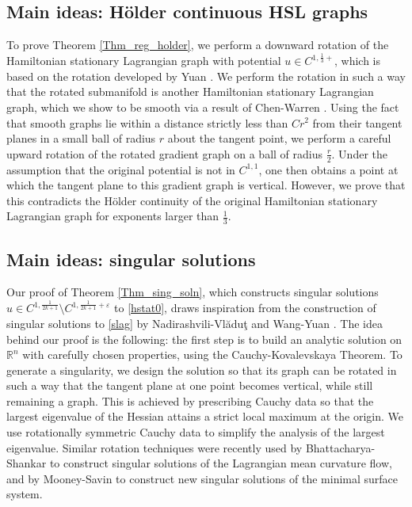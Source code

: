 \documentclass[12pt,reqno]{amsart}%
\theoremstyle{plain}
\numberwithin{equation}{section}
\theoremstyle{definition}
\theoremstyle{remark}
\newcommand{\R}{\mathbb{R}}
\begin{document}
\subsection{Main ideas: H\"older continuous HSL graphs} To prove Theorem \ref{Thm_reg_holder}, we perform a downward rotation of the Hamiltonian stationary Lagrangian graph with potential $u\in C^{1, \frac{1}{3}+}$, which is based on the rotation developed by Yuan \cite{YY02}.
We perform the rotation in such a way that the rotated submanifold is another Hamiltonian stationary Lagrangian graph, which we show to be smooth via a result of Chen-Warren \cite{ChenWarren}. 
Using the fact that smooth graphs lie within a distance strictly less than $Cr^2$ from their tangent planes in a small ball of radius $r$ about the tangent point, we perform a careful upward rotation of the rotated gradient graph on a ball of radius $\frac{r}{2}$. Under the assumption that the original potential is not in $C^{1,1}$, one then obtains a point at which the tangent plane to this gradient graph is vertical. However, we prove that this contradicts the Hölder continuity of the original Hamiltonian stationary Lagrangian graph for exponents larger than $\frac{1}{3}$. 














\subsection{Main ideas: singular solutions} 
Our proof of Theorem \ref{Thm_sing_soln}, which constructs singular solutions $u \in  C^{1, \frac 1{2k+1}} \setminus C^{1,\frac1{2k+1} + \varepsilon }$ to \eqref{hstat0}, draws inspiration from the construction of singular solutions to \eqref{slag} by Nadirashvili-Vl\u{a}du\c{t} \cite{NV} and Wang-Yuan \cite{WangY}. The idea behind our proof is the following: the first step is to build an analytic solution on $\R^n$ with carefully chosen properties, using the Cauchy-Kovalevskaya Theorem. To generate a singularity, we design the solution so that its graph can be rotated in such a way that the tangent plane at one point becomes vertical, while still remaining a graph. This is achieved by prescribing Cauchy data so that the largest eigenvalue of the Hessian attains a strict local maximum at the origin. We use rotationally symmetric Cauchy data to simplify the analysis of the largest eigenvalue. Similar rotation techniques were recently used by Bhattacharya-Shankar \cite{BS1} to construct singular solutions of the Lagrangian mean curvature flow, and by Mooney-Savin \cite{MooneySavin24} to construct new singular solutions of the minimal surface system.
\end{document}
